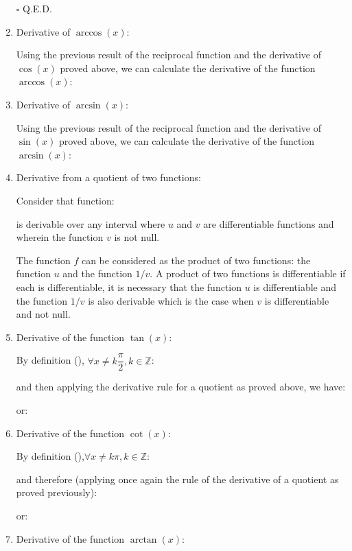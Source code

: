 \begin{enumerate}
\begin{dem}
		 	\begin{flushright}
			$\square$  Q.E.D.
			\end{flushright}
		 \end{dem}
		 \item Derivative of $\arccos (x)$:
		 
		 	Using the previous result of the reciprocal function and the derivative of $\cos (x)$ proved above, we can calculate the derivative of the function $\arccos (x)$:
		 	
		 	\item Derivative of $\arcsin (x)$:
		 
		 	Using the previous result of the reciprocal function and the derivative of $\sin (x)$ proved above, we can calculate the derivative of the function $\arcsin (x)$:
		 	
		 	\item Derivative from a quotient of two functions:
		 	
		 	Consider that function:
		 	
		 	is derivable over any interval where $u$ and $v$ are differentiable functions and wherein the function $v$ is not null.
		 	
		 	The function $f$ can be considered as the product of two functions: the function $u$ and the function $1/v$. A product of two functions is differentiable if each is differentiable, it is necessary that the function $u$ is differentiable and the function $1/v$ is also derivable which is the case when $v$ is differentiable and not null.
		 	
		 	\item Derivative of the function $\tan(x)$:
		 	
		 	By definition (), $\forall x \neq k\dfrac{\pi}{2},k\in \mathbb{Z}$:
		 	
		 	and then applying the derivative rule for a quotient as proved above, we have:
		 	
		 	or:
		 	
		 	\item Derivative of the function $\cot(x)$:
		 	
		 	By definition (),$\forall x \neq k\pi,k\in \mathbb{Z}$:
		 	
		 	and therefore (applying once again the rule of the derivative of a quotient as proved previously):
		 	
		 	or:
		 	
		 	\item Derivative of the function  $\arctan(x)$:
		 	

\end{enumerate}

